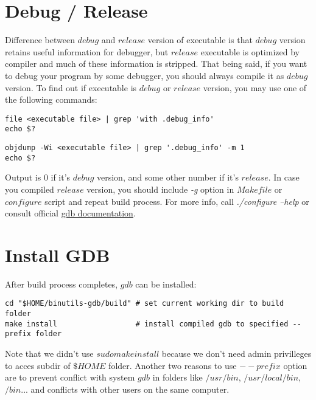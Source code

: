 \documentclass{report}
\begin{document}
\section *{Debug / Release}
Difference between $debug$ and $release$ version of executable is that $debug$ version retains useful information for debugger, but $release$ executable is optimized by compiler and much of these information is stripped. That being said, if you want to debug your program by some debugger, you should always compile it as $debug$ version.
To find out if executable is $debug$ or $release$ version, you may use one of the following commands:
\begin{verbatim}
file <executable file> | grep 'with .debug_info'
echo $?
\end{verbatim}
\begin{verbatim}
objdump -Wi <executable file> | grep '.debug_info' -m 1
echo $?
\end{verbatim}
Output is $0$ if it's $debug$ version, and some other number if it's $release$.
In case you compiled $release$ version, you should include \textit{-g} option in $Makefile$ or $configure$ script and repeat build process. For more info, call \textit{./configure --help} or consult official \href{https://github.com/bminor/binutils-gdb/tree/master/gdb}{\underline{gdb documentation}}.

\section *{Install GDB}
After build process completes, $gdb$ can be installed:
\begin{verbatim}
cd "$HOME/binutils-gdb/build" # set current working dir to build folder
make install                  # install compiled gdb to specified --prefix folder
\end{verbatim}
Note that we didn't use $sudo make install$ because we don't need admin privilleges to acces subdir of $\$HOME$ folder. Another two reasons to use $--prefix$ option are to prevent conflict with system $gdb$ in folders like $/usr/bin$, $/usr/local/bin$, $/bin$... and conflicts with other users on the same computer.
\end{document}
